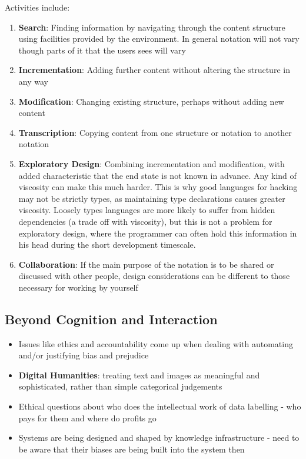 \documentclass{article}
\begin{document}
Activities include:
\begin{enumerate}
    \item \textbf{Search}: Finding information by navigating through the content structure using facilities provided by the environment. In general notation will not vary though parts of it that the users sees will vary
    
    \item \textbf{Incrementation}: Adding further content without altering the structure in any way
    
    \item \textbf{Modification}: Changing existing structure, perhaps without adding new content
    
    \item \textbf{Transcription}: Copying content from one structure or notation to another notation
    
    \item \textbf{Exploratory Design}: Combining incrementation and modification, with added characteristic that the end state is not known in advance. Any kind of viscosity can make this much harder. This is why good languages for hacking may not be strictly types, as maintaining type declarations causes greater viscosity. Loosely types languages are more likely to suffer from hidden dependencies (a trade off with viscosity), but this is not a problem for exploratory design, where the programmer can often hold this information in his head during the short development timescale.
    
    \item \textbf{Collaboration}: If the main purpose of the notation is to be shared or discussed with other people, design considerations can be different to those necessary for working by yourself
\end{enumerate}

\subsection{Beyond Cognition and Interaction}
\begin{itemize}
    \item Issues like ethics and accountability come up when dealing with automating and/or justifying bias and prejudice
    \item \textbf{Digital Humanities}: treating text and images as meaningful and sophisticated, rather than simple categorical judgements
    \item Ethical questions about who does the intellectual work of data labelling - who pays for them and where do profits go
    \item Systems are being designed and shaped by knowledge infrastructure - need to be aware that their biases are being built into the system then
\end{itemize}
\end{document}
